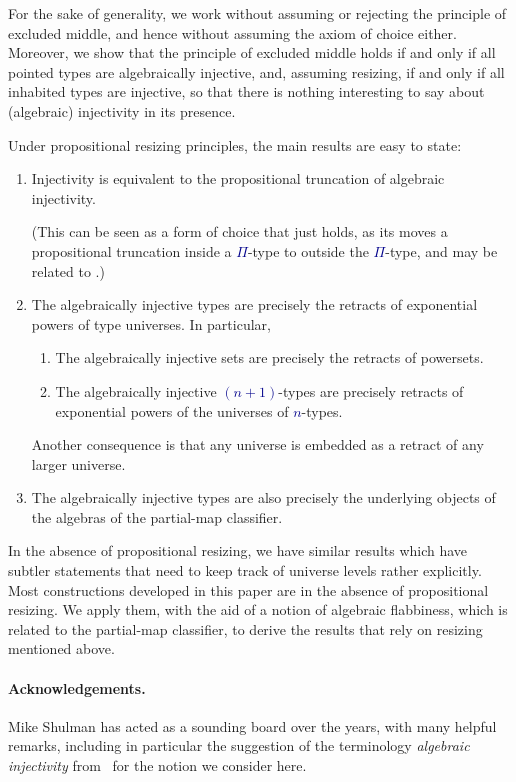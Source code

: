 \documentclass[10pt]{article}
\newcommand{\db}{\textcolor{darkblue}}
\newcommand{\m}[1]{\db{$#1$}}
\theoremstyle{definition}
\begin{document}
For the sake of generality, we work without assuming or rejecting the
principle of excluded middle, and hence without assuming the axiom of
choice either. Moreover, we show that the principle of excluded middle
holds if and only if all pointed types are algebraically injective,
and, assuming resizing, if and only if all inhabited types are
injective, so that there is nothing interesting to say about
(algebraic) injectivity in its presence.

Under propositional resizing principles, the main results
are easy to state:
\begin{enumerate}
\item Injectivity is equivalent to the propositional truncation of
  algebraic injectivity.

  (This can be seen as a form of choice that
  just holds, as its moves a propositional truncation inside a
  \m{\Pi}-type to outside the \m{\Pi}-type, and may be related to
  \cite{kenney:2011}.)
   \item The algebraically injective types are precisely the retracts of
     exponential powers of type universes. In particular,
       \begin{enumerate}
       \item The algebraically injective sets are precisely the
         retracts of powersets.

       \item The algebraically injective \m{(n+1)}-types are precisely
         retracts of exponential powers of the universes of \m{n}-types.
       \end{enumerate}
     Another consequence is that any universe is embedded as a retract of any
     larger universe.
   \item The algebraically injective types are also precisely the
       underlying objects of the algebras of the partial-map
       classifier.
\end{enumerate}
In the absence of propositional resizing, we have similar results
which have subtler statements that need to keep track of universe
levels rather explicitly.
%
Most constructions developed in this paper are in the absence of
propositional resizing. We apply them, with the aid of a notion of
algebraic flabbiness, which is related to the partial-map classifier,
to derive the results that rely on resizing mentioned above.

\paragraph{Acknowledgements.} Mike Shulman has acted as a sounding
board over the years, with many helpful remarks, including in
particular the suggestion of the terminology \emph{algebraic
  injectivity} from~\cite{bourke:2017} for the notion we consider
here.
\end{document}
